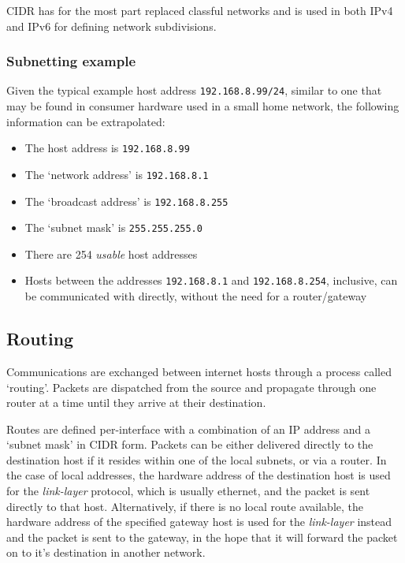     CIDR has for the most part replaced classful networks and is used in both IPv4 and IPv6 for defining network subdivisions.

        \subsubsection{Subnetting example}
        Given the typical example host address \texttt{192.168.8.99/24}, similar to one that may be found in consumer hardware used in a small home network, the following information can be extrapolated:
        \begin{itemize}[noitemsep]
            \item{The host address is \texttt{192.168.8.99}}
            \item{The `network address' is \texttt{192.168.8.1}}
            \item{The `broadcast address' is \texttt{192.168.8.255}}
            \item{The `subnet mask' is \texttt{255.255.255.0}}
            \item{There are 254 \textit{usable} host addresses}
            \item{Hosts between the addresses \texttt{192.168.8.1} and \texttt{192.168.8.254}, inclusive, can be communicated with directly, without the need for a router/gateway}
        \end{itemize}

    \subsection{Routing}
    Communications are exchanged between internet hosts through a process called `routing'. Packets are dispatched from the source and propagate through one router at a time until they arrive at their destination.
    
    Routes are defined per-interface with a combination of an IP address and a `subnet mask' in CIDR form. Packets can be either delivered directly to the destination host if it resides within one of the local subnets, or via a router.
    In the case of local addresses, the hardware address of the destination host is used for the \textit{link-layer} protocol, which is usually ethernet, and the packet is sent directly to that host.
    Alternatively, if there is no local route available, the hardware address of the specified gateway host is used for the \textit{link-layer} instead and the packet is sent to the gateway, in the hope that it will forward the packet on to it's destination in another network.

